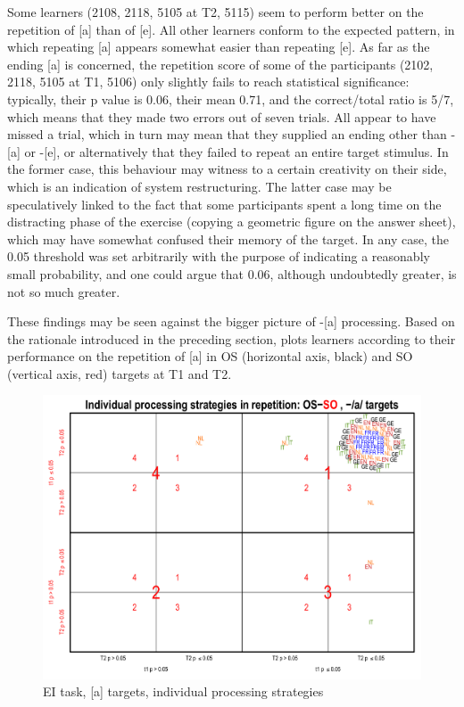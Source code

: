 Some learners (2108, 2118, 5105 at T2, 5115) seem to perform better on the repetition of [a]  than of [e]. All other learners conform to the expected pattern, in which repeating [a] appears somewhat easier than repeating [e]. As far as the ending [a] is concerned, the repetition score of some of the participants (2102, 2118, 5105 at T1, 5106) only slightly fails to reach statistical significance: typically, their p value  is 0.06, their mean 0.71, and the correct/total ratio is 5/7, which means that they made two errors out of seven trials. All appear to have missed a trial, which in turn may mean that they supplied an ending other than -[a] or -[e], or alternatively that they failed to repeat an entire target stimulus. In the former case, this behaviour may witness to a certain creativity on their side, which is an indication of system restructuring. The latter case may be speculatively linked to the fact that some participants spent a long time on the distracting phase of the exercise (copying a geometric figure on the answer sheet), which may have somewhat confused their memory of the target. In any case, the 0.05 threshold was set arbitrarily with the purpose of indicating a reasonably small probability, and one could argue that 0.06, although undoubtedly greater, is not so much greater.

These findings may be seen against the bigger picture of -[a] processing. Based on the rationale introduced in the preceding section,  plots learners according to their performance on the repetition of [a] in OS (horizontal axis, black) and SO (vertical axis, red) targets at T1 and T2.

\begin{figure}
    \includegraphics[width=\textwidth]{figures/04-8.pdf}
    \caption{EI task, [a] targets, individual processing strategies}
    \label{fig:04:8}
\end{figure}

